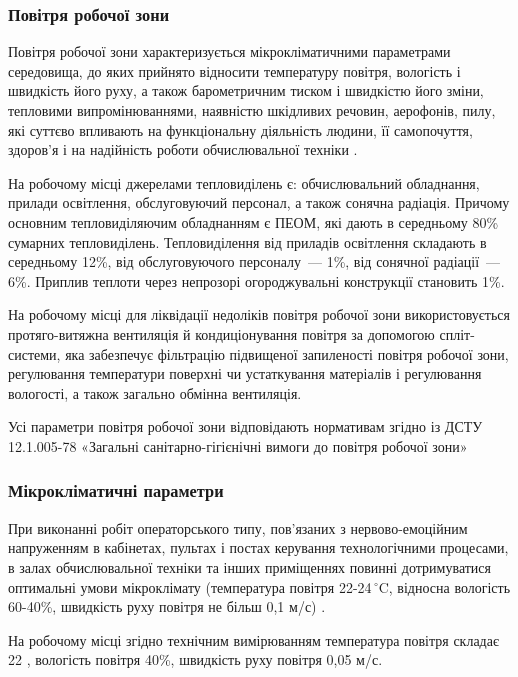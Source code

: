 \documentclass[a4paper,ukrainian,utf8,nocolumnsxix,floatsection,equationsection]{eskdtext}
\renewcommand\paragraph{\subsubsection}
\begin{document}
\paragraph{Повітря робочої зони}

Повітря робочої зони характеризується мікрокліматичними параметрами середовища, до яких прийнято відносити температуру повітря, вологість і швидкість його руху, а також барометричним тиском і швидкістю його зміни, тепловими випромінюваннями, наявністю шкідливих речовин, аерофонів, пилу, які суттєво впливають на функціональну діяльність людини, її самопочуття, здоров'я і на надійність роботи обчислювальної техніки \cite{work:safety:17}. 

На робочому місці джерелами тепловиділень є: обчислювальний обладнання, прилади освітлення, обслуговуючий персонал, а також сонячна радіація. Причому основним тепловиділяючим обладнанням є ПЕОМ, які дають в середньому 80\% сумарних тепловиділень. Тепловиділення від приладів освітлення складають в середньому 12\%, від обслуговуючого персоналу~--- 1\%, від сонячної радіації~--- 6\%. Приплив теплоти через непрозорі огороджувальні конструкції становить 1\%.

На робочому місці для ліквідації недоліків повітря робочої зони використовується протяго-витяжна вентиляція й кондиціонування повітря за допомогою спліт-системи, яка забезпечує фільтрацію підвищеної запиленості повітря робочої зони, регулювання температури поверхні чи устаткування матеріалів і регулювання вологості, а також загально обмінна вентиляція.

Усі параметри повітря робочої зони відповідають нормативам згідно із  ДСТУ 12.1.005-78 «Загальні санітарно-гігієнічні вимоги до повітря робочої зони»

\paragraph{Мікрокліматичні параметри}

При виконанні робіт операторського типу, пов'язаних з нервово-емоційним напруженням в кабінетах, пультах і постах керування технологічними процесами, в залах обчислювальної техніки та інших приміщеннях повинні дотримуватися оптимальні умови мікроклімату (температура повітря 22-24$\,^{\circ}\mathrm{C}$, відносна вологість 60-40\%, швидкість руху повітря не більш 0,1 м/с) \cite{work:safety:17}.

На робочому місці згідно технічним вимірюванням температура повітря складає 22 , вологість повітря 40\%, швидкість руху повітря 0,05 м/с.
\end{document}

